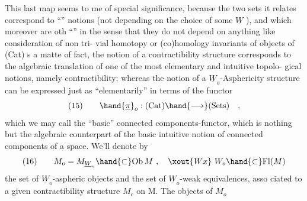 This last map seems to me of special significance,  because the
two sets it relates correspond to ``\hand{\uline{\textcolor{black}{absolute}}}'' notions  (not depending on
the choice of some $\underline{W}$ ),  and which moreover are oth ``\hand{\uline{\textcolor{black}{elementary}}}''\hand{,} in the
sense that they do not depend on anything like consideration of non tri-%
vial homotopy or (co)homology invariants of objects of (Cat)  s a matte
of fact,  the notion of a contractibility structure corresponds to the
algebraic translation of one of the most elementary and intuitive topolo-%
gical notions,   namely contractibility;  whereas the notion
of a $\underline{W}_{o}$-Asphericity structure can be expressed just as ``elementarily'' in
terms of the functor \xout{:}
\[ (15) \qquad \hand{\underline{\pi}}_{o} : (\mathrm{Cat}) \hand{\longrightarrow} (\mathrm{Sets}) \quad , \]
which we may call the ``basic'' connected components-functor,  which is
nothing but the algebraic counterpart of the basic intuitive notion of
connected components of a space.  We'll denote by
\[ (16) \qquad M_{o} = M_{\underline{W}_{o}} \hand{\subset} \mathrm{Ob}\, M \ , \quad \xout{Wx}\ W_{o} \hand{\subset} \mathrm{Fl}(M) \]
the set of $\underline{W}_{o}$-aspheric objects and the set of $\underline{W}_{o}$-weak equivalences,  asso
ciated to a given contractibility structure $M_{c}$ on M.  The objects of $M_{o}$

